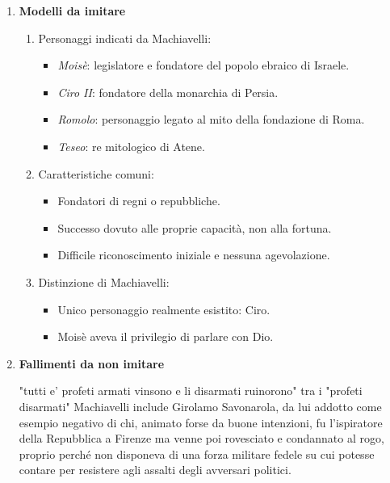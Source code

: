 \documentclass{article}
\begin{document}
\begin{enumerate}
    \item \textbf{Modelli da imitare}
    \begin{enumerate}[label*=\arabic*.]
        \item Personaggi indicati da Machiavelli:
        \begin{itemize}
            \item \textit{Moisè}: legislatore e fondatore del popolo ebraico di Israele.
            \item \textit{Ciro II}: fondatore della monarchia di Persia.
            \item \textit{Romolo}: personaggio legato al mito della fondazione di Roma.
            \item \textit{Teseo}: re mitologico di Atene.
        \end{itemize}
        \item Caratteristiche comuni:
        \begin{itemize}
            \item Fondatori di regni o repubbliche.
            \item Successo dovuto alle proprie capacità, non alla fortuna.
            \item Difficile riconoscimento iniziale e nessuna agevolazione.
        \end{itemize}
        \item Distinzione di Machiavelli:
        \begin{itemize}
            \item Unico personaggio realmente esistito: Ciro.
            \item Moisè aveva il privilegio di parlare con Dio.
        \end{itemize}
    \end{enumerate}

    \item \textbf{Fallimenti da non imitare}

        "tutti e’ profeti armati vinsono e li disarmati ruinorono"
        tra i "profeti disarmati" Machiavelli include Girolamo Savonarola, da lui addotto 
        come esempio negativo di chi, animato forse da buone intenzioni, fu l'ispiratore 
        della Repubblica a Firenze ma venne poi rovesciato e condannato al rogo, proprio 
        perché non disponeva di una forza militare fedele su cui potesse contare per 
        resistere agli assalti degli avversari politici.


\end{enumerate}
\end{document}
